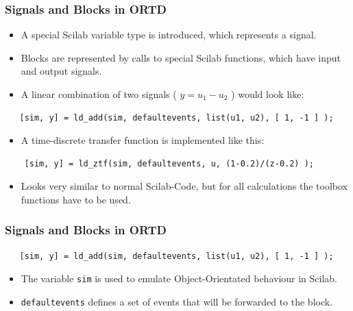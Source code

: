 \documentclass[serif,9pt,xcolor=dvipsnames]{beamer}
\begin{document}
\begin{frame}[fragile]
  \frametitle{Signals and Blocks in ORTD}

\begin{itemize}
 \item A special Scilab variable type is introduced, which represents a signal.
 \item Blocks are represented by calls to special Scilab functions, which have input and output signals.
\end{itemize}

\begin{itemize}
 \item A linear combination of two signals ( $y=u_1 - u_2$ ) would look like:
\end{itemize}


{\small 
\begin{lstlisting}
   [sim, y] = ld_add(sim, defaultevents, list(u1, u2), [ 1, -1 ] );
\end{lstlisting}}
  

\begin{itemize}
 \item A time-discrete transfer function is implemented like this:
\end{itemize}

{\small 
\begin{lstlisting} 
    [sim, y] = ld_ztf(sim, defaultevents, u, (1-0.2)/(z-0.2) );
\end{lstlisting}}


\begin{itemize}
 \item Looks very similar to normal Scilab-Code, but for all calculations the toolbox functions have to be used.
\end{itemize}
 


\end{frame}



\begin{frame}[fragile]
\frametitle{Signals and Blocks in ORTD}
 
 
{\small 
\begin{lstlisting}
   [sim, y] = ld_add(sim, defaultevents, list(u1, u2), [ 1, -1 ] );
\end{lstlisting}}
 
 \begin{itemize}
  \item The variable \texttt{sim} is used to emulate Object-Orientated behaviour in Scilab.
\item \texttt{defaultevents} defines a set of events that will be forwarded to the block.
 \end{itemize}

 
\end{frame}
\end{document}
